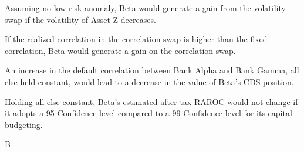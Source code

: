 \documentclass{article}
\begin{document}
\begin{choices}
    \item Assuming no low-risk anomaly, Beta would generate a gain from the volatility swap if the volatility of Asset Z decreases.
    \item If the realized correlation in the correlation swap is higher than the fixed correlation, Beta would generate a gain on the correlation swap.
    \item An increase in the default correlation between Bank Alpha and Bank Gamma, all else held constant, would lead to a decrease in the value of Beta's CDS position.
    \item Holding all else constant, Beta's estimated after-tax RAROC would not change if it adopts a 95-Confidence level compared to a 99-Confidence level for its capital budgeting.
\end{choices}

\begin{correctanswer}
    B
\end{correctanswer}
\end{document}
